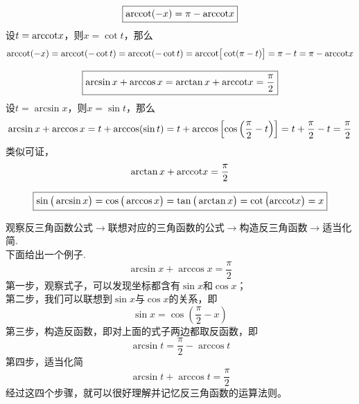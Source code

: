 \begin{equation}
	\boxed{ \text{arccot} (-x) = \pi - \text{arccot} x}
\end{equation}
\proof 设$t = \text{arccot} x$，则$x = \cot t$，那么\\[-2.2em]
$$
\arccot (-x) = \arccot(- \cot t) = \arccot (- \cot t) = \arccot \big[ \cot(\pi - t) \big] = \pi - t = \pi - \arccot x
\vspace*{-0.5em}
$$

\begin{equation}
	\boxed{\arcsin x + \arccos x = \arctan x + \text{arccot} x = \dfrac{\pi}{2}}
\end{equation}
\proof 设$t = \arcsin x$，则$x = \sin t$，那么\\[-2.2em]
$$
\arcsin x + \arccos x = t + \arccos(\sin t) = t + \arccos \left[ \cos \left( \dfrac{\pi}{2} - t \right) \right] = t + \dfrac{\pi}{2} - t = \dfrac{\pi}{2}
\vspace*{-0.5em}
$$
类似可证，
$$
\arctan x + \arccot x = \dfrac{\pi}{2}
\vspace*{-0.5em}
$$

\begin{equation}
	\boxed{\sin \big( \arcsin x \big) = \cos \big( \arccos x \big) = \tan \big( \arctan x \big) = \cot \big( \text{arccot} x \big) = x}
\end{equation}
\vspace*{0.1em}

\begin{tcolorbox}[title=记忆方法]
\quad 观察反三角函数公式$\longrightarrow$联想对应的三角函数的公式$\longrightarrow$构造反三角函数$\longrightarrow$适当化简.\\
\hspace*{1.5em} 下面给出一个例子.
\begin{equation*}
	\arcsin x + \arccos x = \dfrac{\pi}{2}
\end{equation*}
第一步，观察式子，可以发现坐标都含有$\sin x$和$\cos x$；\\
第二步，我们可以联想到$\sin x$与$\cos x$的关系，即
$$
	\sin x = \cos \left( \dfrac{\pi}{2} - x \right) 
$$
第三步，构造反函数，即对上面的式子两边都取反函数，即
$$
	\arcsin t = \dfrac{\pi}{2} - \arccos t
$$
第四步，适当化简
$$
	\arcsin t + \arccos t = \dfrac{\pi}{2}
$$
经过这四个步骤，就可以很好理解并记忆反三角函数的运算法则。
\end{tcolorbox}
\vspace*{1em}




